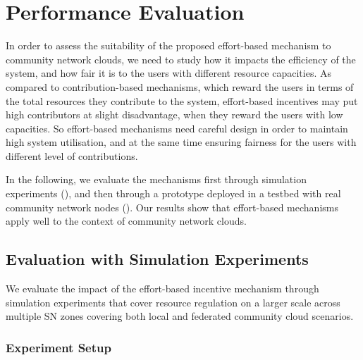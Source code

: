 


\section{Performance Evaluation}
\label{sec__incentivise_evaluation}

In order to assess the suitability of the proposed effort-based mechanism
to community network clouds, 
we need to study how it impacts the efficiency of the system,
and how fair it is to the users with different resource capacities.
As compared to contribution-based mechanisms, which reward the users 
in terms of the total resources they contribute to the system,
effort-based incentives may put high contributors at slight disadvantage,
when they reward the users with low capacities.
So effort-based mechanisms need careful design in order to maintain high system utilisation,
and at the same time ensuring fairness for the users with different level of contributions.

In the following, we evaluate the mechanisms first through simulation experiments (),
and then through a prototype deployed in a testbed 
with real community network nodes ().
Our results show that effort-based mechanisms apply well to the context of community network clouds.

\subsection{Evaluation with Simulation Experiments}
\label{sec__incentivise_evaluation_simulation}

We evaluate the impact of the effort-based incentive mechanism through simulation experiments 
that cover resource regulation on a larger scale across multiple SN zones 
covering both local and federated community cloud scenarios.

\subsubsection{Experiment Setup}

